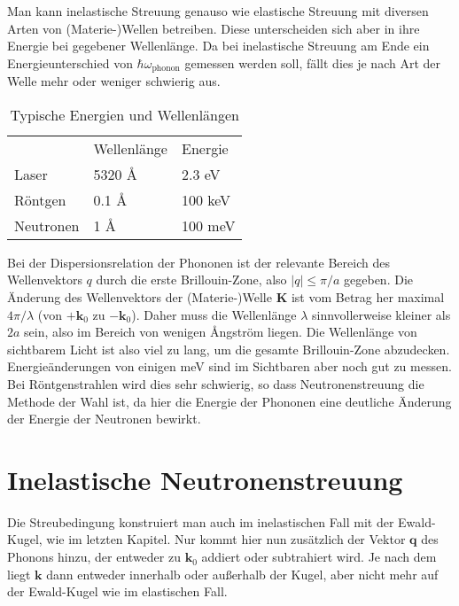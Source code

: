 Man kann inelastische Streuung genauso wie elastische Streuung mit diversen Arten von (Materie-)Wellen betreiben. Diese unterscheiden sich aber in ihre Energie bei gegebener Wellenlänge. Da bei inelastische Streuung am Ende ein Energieunterschied von $\hbar
 \omega_\text{phonon} $ gemessen werden soll, fällt dies je nach Art der Welle mehr oder weniger schwierig aus.
 
 \begin{table}
 \begin{tabular}{lll}
          & Wellenlänge & Energie \\
   Laser & 5320 \AA & 2.3 eV \\
   Röntgen & 0.1 \AA & 100 keV \\
   Neutronen & 1 \AA & 100 meV \\
 \end{tabular}
 \caption{Typische Energien und Wellenlängen}
 \end{table}

Bei der Dispersionsrelation der Phononen ist der relevante Bereich des Wellenvektors $q$ durch die erste Brillouin-Zone, also $| q | \le \pi / a$ gegeben.  Die Änderung des Wellenvektors der (Materie-)Welle $\mathbf{K}$ ist vom Betrag her maximal $4 \pi / \lambda$ (von $+\mathbf{k}_0$ zu $-\mathbf{k}_0$). Daher muss die Wellenlänge $\lambda$ sinnvollerweise kleiner als $2a$ sein, also im Bereich von wenigen Ångström liegen.
 Die Wellenlänge von sichtbarem Licht ist also viel zu lang, um die gesamte Brillouin-Zone abzudecken. Energieänderungen  von einigen meV sind im Sichtbaren aber noch gut zu messen. Bei Röntgenstrahlen wird dies sehr schwierig, so dass Neutronenstreuung die Methode der Wahl ist, da hier die Energie der Phononen eine deutliche Änderung der Energie der Neutronen bewirkt.




\section{Inelastische Neutronenstreuung}


Die Streubedingung konstruiert man auch im inelastischen Fall mit der Ewald-Kugel, wie im letzten Kapitel. Nur kommt hier nun zusätzlich der Vektor $\mathbf{q}$ des Phonons hinzu, der entweder zu $\mathbf{k}_0$ addiert oder subtrahiert wird. Je nach dem liegt $\mathbf{k}$ dann entweder innerhalb oder außerhalb der Kugel, aber nicht mehr auf der Ewald-Kugel wie im elastischen Fall.

